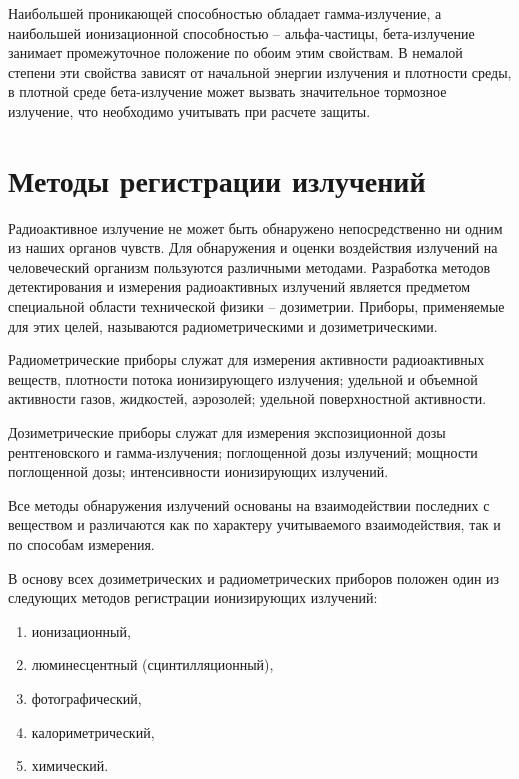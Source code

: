 \documentclass[14pt,pscyr,titlepage]{hedreport}
\begin{document}
		Наибольшей проникающей способностью обладает гамма-излучение, а 
		наибольшей ионизационной способностью -- альфа-частицы, бета-излучение 
		занимает промежуточное положение по обоим этим свойствам. В немалой 
		степени эти свойства зависят от начальной энергии излучения и 
		плотности среды, в плотной среде бета-излучение может вызвать 
		значительное тормозное излучение, что необходимо учитывать при 
		расчете защиты.

	\section{Методы регистрации излучений}
		Радиоактивное излучение не может быть обнаружено непосредственно ни 
		одним из наших органов чувств. Для обнаружения и оценки воздействия 
		излучений на человеческий организм  пользуются различными методами. 
		Разработка методов детектирования и измерения радиоактивных излучений 
		является предметом специальной области технической физики -- 
		дозиметрии. Приборы, применяемые для этих целей, называются 
		радиометрическими и дозиметрическими.

		Радиометрические приборы служат для измерения активности радиоактивных 
		веществ, плотности потока ионизирующего излучения; удельной и объемной 
		активности газов, жидкостей, аэрозолей; удельной поверхностной активности.

		Дозиметрические приборы служат для измерения экспозиционной дозы 
		рентгеновского и гамма-излучения; поглощенной дозы излучений; мощности 
		поглощенной дозы; интенсивности ионизирующих излучений. 

		Все методы обнаружения излучений основаны на взаимодействии последних с 
		веществом и различаются как по характеру учитываемого взаимодействия, 
		так и по способам измерения.

		В основу всех дозиметрических и радиометрических приборов положен 
		один из следующих методов регистрации ионизирующих излучений:
		\begin{enumerate}\itemsep-2pt
			\item ионизационный,
			\item люминесцентный (сцинтилляционный),
			\item фотографический,
			\item калориметрический,
			\item химический.
		\end{enumerate}
\end{document}
